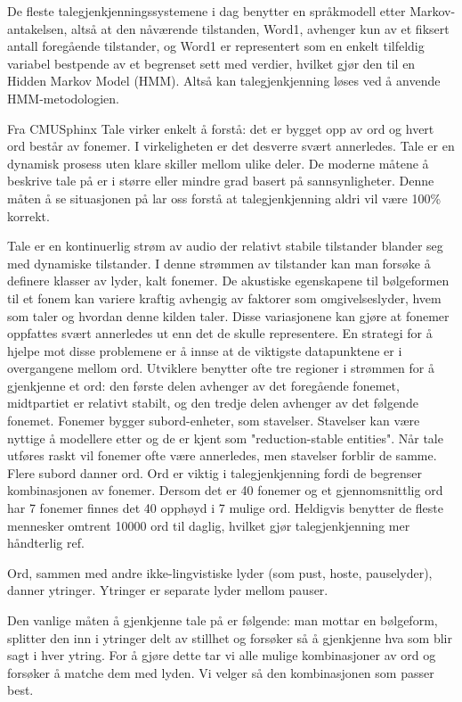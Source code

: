 {De fleste talegjenkjenningssystemene i dag benytter en språkmodell etter Markov-antakelsen, altså at den nåværende tilstanden, Word1, avhenger kun av et fiksert antall foregående tilstander, og Word1 er representert som en enkelt tilfeldig variabel bestpende av et begrenset sett med verdier, hvilket gjør den til en Hidden Markov Model (HMM). Altså kan talegjenkjenning løses ved å anvende HMM-metodologien.

{\color{blue}Fra CMUSphinx}
Tale virker enkelt å forstå: det er bygget opp av ord og hvert ord består av fonemer. I virkeligheten er det desverre svært annerledes. Tale er en dynamisk prosess uten klare skiller mellom ulike deler. De moderne måtene å beskrive tale på er i større eller mindre grad basert på sannsynligheter. Denne måten å se situasjonen på lar oss forstå at talegjenkjenning aldri vil være 100\% korrekt.

Tale er en kontinuerlig strøm av audio der relativt stabile tilstander blander seg med dynamiske tilstander. I denne strømmen av tilstander kan man forsøke å definere klasser av lyder, kalt fonemer. De akustiske egenskapene til bølgeformen til et fonem kan variere kraftig avhengig av faktorer som omgivelseslyder, hvem som taler og hvordan denne kilden taler. Disse variasjonene kan gjøre at fonemer oppfattes svært annerledes ut enn det de skulle representere. 
En strategi for å hjelpe mot disse problemene er å innse at de viktigste datapunktene er i overgangene mellom ord. Utviklere benytter ofte tre regioner i strømmen for å gjenkjenne et ord: den første delen avhenger av det foregående fonemet, midtpartiet er relativt stabilt, og den tredje delen avhenger av det følgende fonemet. Fonemer bygger subord-enheter, som stavelser. Stavelser kan være nyttige å modellere etter og de er kjent som "reduction-stable entities". Når tale utføres raskt vil fonemer ofte være annerledes, men stavelser forblir de samme. Flere subord danner ord. Ord er viktig i talegjenkjenning fordi de begrenser kombinasjonen av fonemer. Dersom det er 40 fonemer og et gjennomsnittlig ord har 7 fonemer finnes det 40 opphøyd i 7 mulige ord. Heldigvis benytter de fleste mennesker omtrent 10000 ord til daglig, hvilket gjør talegjenkjenning mer håndterlig {\color{red}ref}.

Ord, sammen med andre ikke-lingvistiske lyder (som pust, hoste, pauselyder), danner ytringer. Ytringer er separate lyder mellom pauser. 

Den vanlige måten å gjenkjenne tale på er følgende: man mottar en bølgeform, splitter den inn i ytringer delt av stillhet og forsøker så å gjenkjenne hva som blir sagt i hver ytring. For å gjøre dette tar vi alle mulige kombinasjoner av ord og forsøker å matche dem med lyden. Vi velger så den kombinasjonen som passer best.

}
